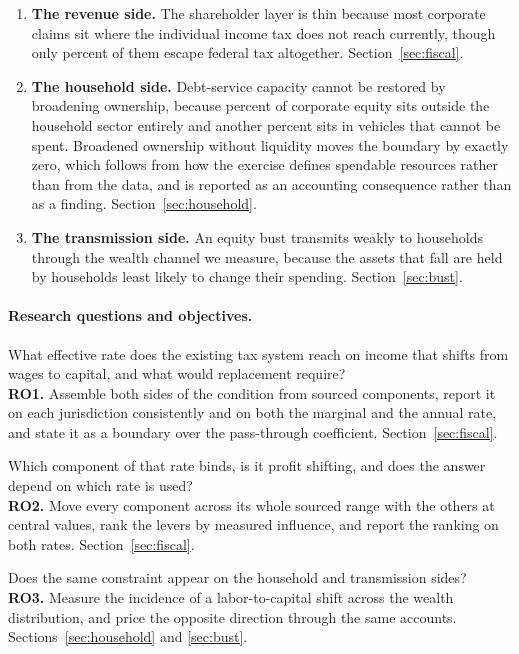 \begin{enumerate}[leftmargin=1.6em]
  \item \textbf{The revenue side.} The shareholder layer is thin because most corporate claims
  sit where the individual income tax does not reach currently, though only
   percent of them escape federal tax altogether.
  Section~\ref{sec:fiscal}.
  \item \textbf{The household side.} Debt-service capacity cannot be restored by broadening
  ownership, because  percent of corporate equity sits outside
  the household sector entirely and another  percent sits in
  vehicles that cannot be spent. Broadened ownership without liquidity moves the boundary by
  exactly zero, which follows from how the exercise defines spendable resources rather than from
  the data, and is reported as an accounting consequence rather than as a finding.
  Section~\ref{sec:household}.
  \item \textbf{The transmission side.} An equity bust transmits weakly to households through the
  wealth channel we measure, because the assets that fall are held by households least likely to
  change their
  spending. Section~\ref{sec:bust}.
\end{enumerate}

\paragraph{Research questions and objectives.}

\begin{description}[leftmargin=2.2em,style=nextline]
  \item[RQ1] What effective rate does the existing tax system reach on income that shifts from
  wages to capital, and what would replacement require? \\
  \textbf{RO1.} Assemble both sides of the condition from sourced components, report it on each
  jurisdiction consistently and on both the marginal and the annual rate, and state it as a
  boundary over the pass-through coefficient. Section~\ref{sec:fiscal}.
  \item[RQ2] Which component of that rate binds, is it profit shifting, and does the answer
  depend on which rate is used? \\
  \textbf{RO2.} Move every component across its whole sourced range with the others at central
  values, rank the levers by measured influence, and report the ranking on both rates.
  Section~\ref{sec:fiscal}.
  \item[RQ3] Does the same constraint appear on the household and transmission sides? \\
  \textbf{RO3.} Measure the incidence of a labor-to-capital shift across the wealth
  distribution, and price the opposite direction through the same accounts.
  Sections~\ref{sec:household} and \ref{sec:bust}.
\end{description}

